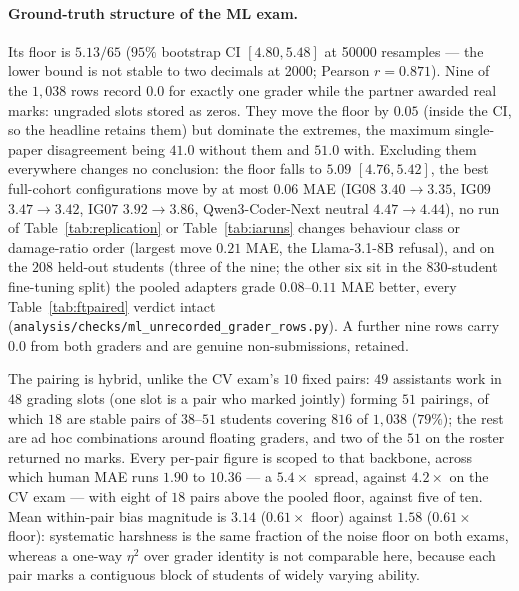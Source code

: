 \paragraph{Ground-truth structure of the ML exam.}
Its floor is $5.13 / 65$ ($95\%$ bootstrap CI $[4.80, 5.48]$ at \num{50000} resamples --- the lower bound is not stable to two decimals at \num{2000}; Pearson $r = 0.871$). Nine of the $1{,}038$ rows record $0.0$ for exactly one grader while the partner awarded real marks: ungraded slots stored as zeros. They move the floor by $0.05$ (inside the CI, so the headline retains them) but dominate the extremes, the maximum single-paper disagreement being $41.0$ without them and $51.0$ with. Excluding them everywhere changes no conclusion: the floor falls to $5.09$ $[4.76, 5.42]$, the best full-cohort configurations move by at most $0.06$ MAE (IG$08$ $3.40 \to 3.35$, IG$09$ $3.47 \to 3.42$, IG$07$ $3.92 \to 3.86$, Qwen3-Coder-Next neutral $4.47 \to 4.44$), no run of Table~\ref{tab:replication} or Table~\ref{tab:iaruns} changes behaviour class or damage-ratio order (largest move $0.21$ MAE, the Llama-3.1-$8$B refusal), and on the $208$ held-out students (three of the nine; the other six sit in the $830$-student fine-tuning split) the pooled adapters grade $0.08$--$0.11$ MAE better, every Table~\ref{tab:ftpaired} verdict intact (\texttt{analysis/checks/ml\_unrecorded\_grader\_rows.py}). A further nine rows carry $0.0$ from both graders and are genuine non-submissions, retained.

The pairing is hybrid, unlike the CV exam's $10$ fixed pairs: $49$ assistants work in $48$ grading slots (one slot is a pair who marked jointly) forming $51$ pairings, of which $18$ are stable pairs of $38$--$51$ students covering $816$ of $1{,}038$ ($79\%$); the rest are ad hoc combinations around floating graders, and two of the $51$ on the roster returned no marks. Every per-pair figure is scoped to that backbone, across which human MAE runs $1.90$ to $10.36$ --- a $5.4\times$ spread, against $4.2\times$ on the CV exam --- with eight of $18$ pairs above the pooled floor, against five of ten. Mean within-pair bias magnitude is $3.14$ ($0.61\times$ floor) against $1.58$ ($0.61\times$ floor): systematic harshness is the same fraction of the noise floor on both exams, whereas a one-way $\eta^2$ over grader identity is not comparable here, because each pair marks a contiguous block of students of widely varying ability.

